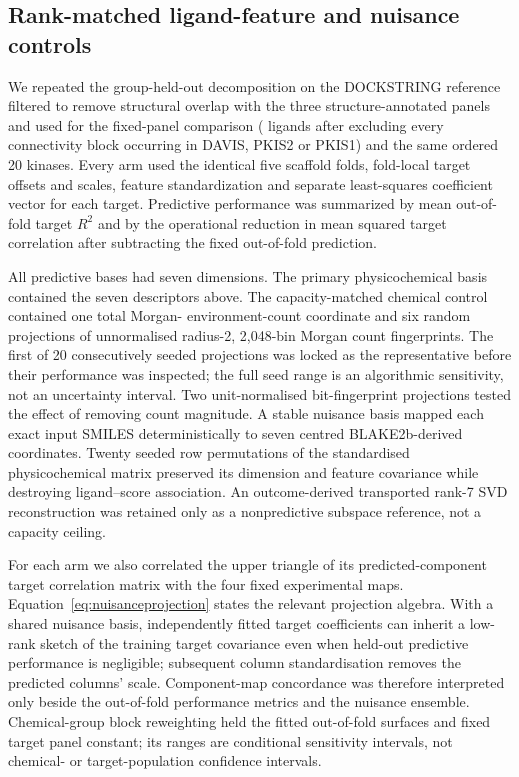 \documentclass[11pt]{article}
\begin{document}
\subsection{Rank-matched ligand-feature and nuisance controls}

We repeated the group-held-out decomposition on the DOCKSTRING reference filtered to remove
structural overlap with the three structure-annotated panels and used for
the fixed-panel comparison (\DescriptorGeometryLigands{} ligands after excluding every
connectivity block occurring in DAVIS, PKIS2 or PKIS1) and the same ordered 20 kinases. Every
arm used the identical five scaffold folds, fold-local target offsets and scales, feature
standardization and separate least-squares coefficient vector for each target. Predictive
performance was summarized by mean out-of-fold target $R^2$ and by the operational reduction
in mean squared target correlation after subtracting the fixed out-of-fold prediction.

All predictive bases had seven dimensions. The primary physicochemical basis contained the
seven descriptors above. The capacity-matched chemical control contained one total Morgan-
environment-count coordinate and six random projections of unnormalised radius-2, 2,048-bin
Morgan count fingerprints. The first of 20 consecutively seeded projections was locked as
the representative before their performance was inspected; the full seed range is an
algorithmic sensitivity, not an uncertainty interval. Two unit-normalised bit-fingerprint
projections tested the effect of removing count magnitude. A stable nuisance basis mapped
each exact input SMILES deterministically to seven centred BLAKE2b-derived coordinates.
Twenty seeded row permutations of the standardised physicochemical matrix preserved its
dimension and feature covariance while destroying ligand--score association. An
outcome-derived transported rank-7 SVD reconstruction was retained only as a nonpredictive
subspace reference, not a capacity ceiling.

For each arm we also correlated the upper triangle of its predicted-component target
correlation matrix with the four fixed experimental maps. Equation~\ref{eq:nuisanceprojection}
states the relevant projection algebra. With a shared nuisance basis, independently fitted
target coefficients can inherit a low-rank sketch of the training target covariance even
when held-out predictive performance is negligible; subsequent column standardisation
removes the predicted columns' scale. Component-map concordance was therefore interpreted
only beside the out-of-fold performance metrics and the nuisance ensemble. Chemical-group block reweighting
held the fitted out-of-fold surfaces and fixed target panel constant; its ranges are
conditional sensitivity intervals, not chemical- or target-population confidence intervals.
\end{document}
